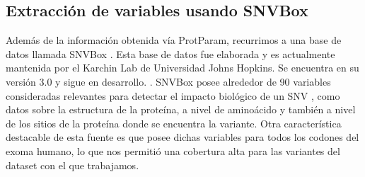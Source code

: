 \subsection{Extracción de variables usando SNVBox}

Además de la información obtenida vía ProtParam, recurrimos a una base de datos llamada SNVBox \todo{[ref]}. Esta base de datos fue elaborada y es actualmente mantenida por el Karchin Lab de Universidad Johns Hopkins. Se encuentra en su versión 3.0 y sigue en desarrollo. . SNVBox posee alrededor de 90 variables consideradas relevantes para detectar el impacto biológico de un SNV \cite{Wong2011}, como datos sobre la estructura de la proteína, a nivel de aminoácido y también a nivel de los sitios de la proteína donde se encuentra la variante. Otra característica destacable de esta fuente es que posee dichas variables para todos los codones del exoma humano, lo que nos permitió una cobertura alta para las variantes del dataset con el que trabajamos. 



